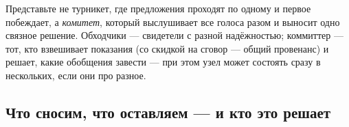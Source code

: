 \begin{intuition}
Представьте не турникет, где предложения проходят по одному и первое побеждает, а
\emph{комитет}, который выслушивает все голоса разом и выносит одно связное решение.
Обходчики — свидетели с разной надёжностью; коммиттер — тот, кто взвешивает показания
(со скидкой на сговор — общий провенанс) и решает, какие обобщения завести — при этом
узел может состоять сразу в нескольких, если они про разное.
\end{intuition}

\subsection{Что сносим, что оставляем — и кто это решает}
\label{sec:consolidation-prune}

